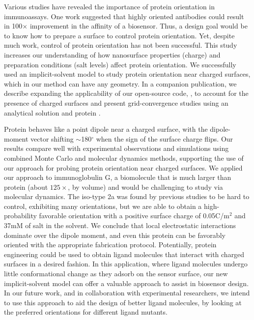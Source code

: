 
Various studies have revealed the importance of protein orientation in immunoassays. One work suggested that highly oriented antibodies could result in 100$\times$ improvement in the affinity of a biosensor.\cite{TajimaTakaiIshihara2011} Thus, a design goal would be to know how to prepare a surface to control protein orientation. Yet, despite much work, control of protein orientation has not been successful.
This study increases our understanding of how nanosurface properties (charge) and preparation conditions (salt levels) affect protein orientation.
We successfully used an implicit-solvent model to study protein orientation near charged surfaces, which in our method can have any geometry. In a companion publication,\cite{CooperBarba2015a} we describe expanding the applicability of our open-source code, \pygbe, to account for the presence of charged surfaces and present grid-convergence studies using an analytical solution and protein \gb. 

Protein \gb behaves like a point dipole near a charged surface, with the dipole-moment vector shifting $\sim$180$^\circ$ when the sign of the surface charge flips. Our results compare well with experimental observations and simulations using combined Monte Carlo and molecular dynamics methods, supporting the use of our approach for probing protein orientation near charged surfaces.
We applied our approach to immunoglobulin G, a biomolecule that is much larger than protein \gb (about $125\times$, by volume) and would be challenging  to study via molecular dynamics. 
The iso-type \ig 2a was found by previous studies to be hard to control, exhibiting many orientations, but we are able to obtain a high-probability favorable orientation with a positive surface charge of 0.05C/m$^{2}$ and 37mM of salt in the solvent. We conclude that local electrostatic interactions dominate over the dipole moment, and even this protein can be favorably oriented with the appropriate fabrication protocol. Potentially, protein engineering could be used to obtain ligand molecules that interact with charged surfaces in a desired fashion.
In this application, where ligand molecules undergo little conformational change as they adsorb on the sensor surface, our new implicit-solvent model can offer a valuable approach to assist in biosensor design. In our future work, and in collaboration with experimental researchers, we intend to use this approach to aid the design of better ligand molecules, by looking at the preferred orientations for different ligand mutants. 
